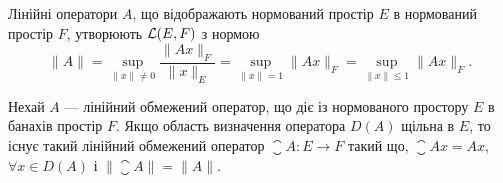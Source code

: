 \begin{definition}
Лінійні оператори $A$, що відображають
нормований простір $E$ в нормований простір $F$, утворюють
 $\mathcal{L}(E, F)$ з нормою
\begin{equation*}
    \|A\| = \sup_{\|x\| \ne 0} \frac{\|A x\|_F}{\|x\|_E} =
    \sup_{\|x\| = 1} \|A x\|_F = \sup_{\|x\| \le 1} \|Ax\|_F.
\end{equation*}
\end{definition}

\begin{theorem}
Нехай $A$ --- лінійний обмежений оператор,
що діє із нормованого простору $E$ в банахів простір $F$. Якщо
область визначення оператора $D(A)$ щільна в $E$, то існує
такий лінійний обмежений оператор $\closure A: E \to F$ такий що,
$\closure A x = A x$, $\forall x \in D(A)$ і $\|\closure A\| = \|A\|$.
\end{theorem}

